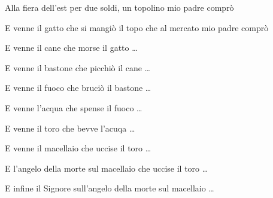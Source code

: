 
\beginchorus

Alla fiera dell'est
per due soldi, un topolino mio padre comprò

\endchorus

\beginverse

E venne il gatto che si mangiò il topo
che al mercato mio padre comprò

\endverse

\chordsoff

\beginverse

E venne il cane che morse il gatto \dots

\endverse

\beginverse

E venne il bastone che picchiò il cane \dots

\endverse

\beginverse

E venne il fuoco che bruciò il bastone \dots

\endverse

\beginverse

E venne l'acqua che spense il fuoco \dots

\endverse

\beginverse

E venne il toro che bevve l'acuqa \dots

\endverse

\beginverse

E venne il macellaio che uccise il toro \dots

\endverse

\beginverse

E l'angelo della morte sul macellaio 
che uccise il toro \dots

\endverse

\beginverse

E infine il Signore sull'angelo della morte
sul macellaio \dots

\endverse

\endsong


